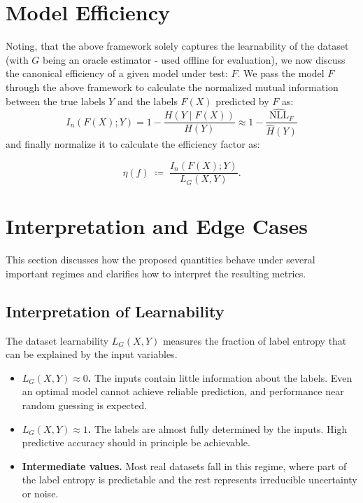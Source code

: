 \documentclass{article}
\begin{document}
\section{Model Efficiency}
Noting, that the above framework solely captures the learnability of the dataset (with $G$ being an oracle estimator - used offline for evaluation), we now
discuss the canonical efficiency of a given model under test: $F$. We pass the model $F$ through the above framework to calculate the normalized mutual 
information between the true labels $Y$ and the labels $F(X)$ predicted by $F$ as:
\begin{equation}
I_n(F(X);Y) = 1 - \frac{H(Y\mid F(X))}{H(Y)}   \approx 1 - \frac{\widehat{\mathrm{NLL}}_F}{\hat H(Y)}
\end{equation}
and finally normalize it to calculate the efficiency factor as:



\begin{equation}
\boxed{
    \eta(f)\;\coloneqq\;\frac{I_n(F(X);Y)}{ L_G(X,Y)}.
}
\end{equation}



\section{Interpretation and Edge Cases}

This section discusses how the proposed quantities behave under several 
important regimes and clarifies how to interpret the resulting metrics.

\subsection{Interpretation of Learnability}

The dataset learnability $L_G(X,Y)$ measures the fraction of label entropy 
that can be explained by the input variables.

\begin{itemize}[leftmargin=2em]

\item \textbf{$L_G(X,Y)\approx 0$.}  
The inputs contain little information about the labels. 
Even an optimal model cannot achieve reliable prediction, and performance 
near random guessing is expected.

\item \textbf{$L_G(X,Y)\approx 1$.}  
The labels are almost fully determined by the inputs. 
High predictive accuracy should in principle be achievable.

\item \textbf{Intermediate values.}  
Most real datasets fall in this regime, where part of the label entropy 
is predictable and the rest represents irreducible uncertainty or noise.

\end{itemize}
\end{document}
